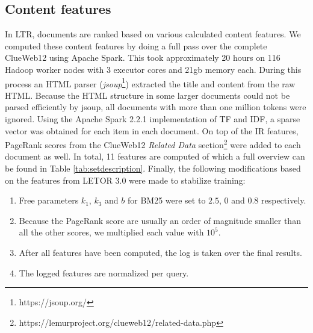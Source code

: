 \subsection{Content features} \label{sec:contentfeature}
In \ac{LTR}, documents are ranked based on various calculated content features. We computed these content features by doing a full pass over the complete ClueWeb12 using Apache Spark. This took approximately 20 hours on 116 Hadoop worker nodes with 3 executor cores and 21gb memory each. During this process an HTML parser (\textit{jsoup}\footnote{https://jsoup.org/}) extracted the title and content from the raw HTML. Because the HTML structure in some larger documents could not be parsed efficiently by jsoup, all documents with more than one million tokens were ignored. Using the Apache Spark 2.2.1 implementation of TF and IDF, a sparse vector was obtained for each item in each document.  On top of the IR features, PageRank scores from the ClueWeb12 \textit{Related Data} section\footnote{https://lemurproject.org/clueweb12/related-data.php} were added to each document as well. In total, 11 features are computed of which a full overview can be found in Table \ref{tab:setdescription}. Finally, the following modifications based on the features from LETOR 3.0 \cite{qin2010letor} were made to stabilize training:
\begin{enumerate}  
\item Free parameters $k_1$, $k_3$ and $b$ for BM25 were set to $2.5$, $0$ and $0.8$ respectively. 
\item Because the PageRank score are usually an order of magnitude smaller than all the other scores, we multiplied each value with $10^5$.
\item After all features have been computed, the log is taken over the final results.
\item The logged features are normalized per query.  
\end{enumerate}


